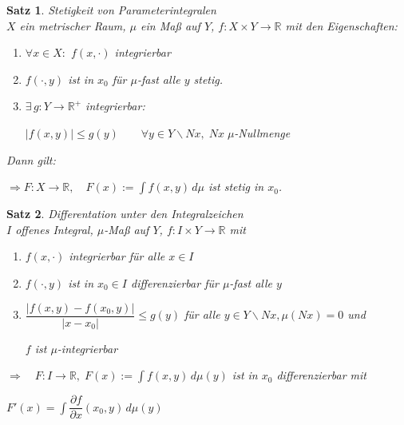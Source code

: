 \documentclass[11pt]{memoir}
\theoremstyle{changebreak}
\newtheorem{Satz}{Satz}[chapter]
\begin{document}


\begin{Satz}
\emph{Stetigkeit von Parameterintegralen} \\
$X$ ein metrischer Raum, $\mu$ ein Maß auf $Y$, $f: X \times Y \rightarrow \mathbb R$ mit den Eigenschaften:
\begin{enumerate}
	\item $\forall x \in X:$ $f(x, \cdotp)$ integrierbar
	\item $f(\cdotp, y)$ ist in $x_0$ für $\mu$-fast alle $y$ stetig.
	\item $\exists\, g: Y \rightarrow \mathbb R^+$ integrierbar: 
		\begin{center}
			$|f(x, y)| \leq g(y)\qquad \forall y \in Y \backslash Nx, \;Nx \;\mu$-Nullmenge
		\end{center}
\end{enumerate}
Dann gilt:
\begin{center}
	$\Rightarrow F: X \rightarrow \mathbb R, \quad F(x):= \int f(x, y) \,d\mu$ \quad ist stetig in $x_0$.
\end{center}
\end{Satz}

\begin{Satz}
\emph{Differentation unter den Integralzeichen} \\
$I$ offenes Integral, $\mu$-Maß auf $Y$, $f: I \times Y \rightarrow \mathbb R$ mit
\begin{enumerate}
	\item $f(x, \cdotp)$ integrierbar für alle $x \in I$
	\item $f(\cdotp, y)$ ist in $x_0 \in I$ differenzierbar für $\mu$-fast alle $y$
	\item $\dfrac{|f(x, y) - f(x_0, y)|}{|x - x_0|} \leq g(y)$ für alle $y \in Y \backslash Nx, \mu(Nx)= 0$ und
	\par
	 $f$ ist $\mu$-integrierbar \\
\end{enumerate}
$\Rightarrow \quad F: I \rightarrow \mathbb R, \;F(x):= \int f(x, y)\, d\mu(y)$ ist in $x_0$ differenzierbar mit 
\begin{center}
	$ F'(x) = \int \dfrac{\partial f}{\partial x}(x_0, y) \,d\mu(y)$
\end{center}
\end{Satz}
\end{document}
